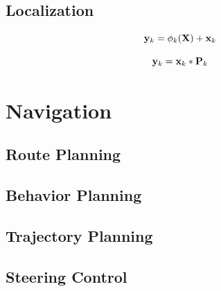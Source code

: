 \subsection{Localization}

\begin{equation}
{\bf y}_k = \phi_k ( {\bf X}) + {\bf x}_k
\label{eq:prn}
\end{equation}


\begin{equation}
{\bf y}_k = {\bf x}_k * {\bf P}_k
\end{equation}

\section{Navigation}

\subsection{Route Planning}
\subsection{Behavior Planning}
\subsection{Trajectory Planning}
\subsection{Steering Control}

\begin{table}[h]
\caption{Results}
\label{table:test}

\end{table}
